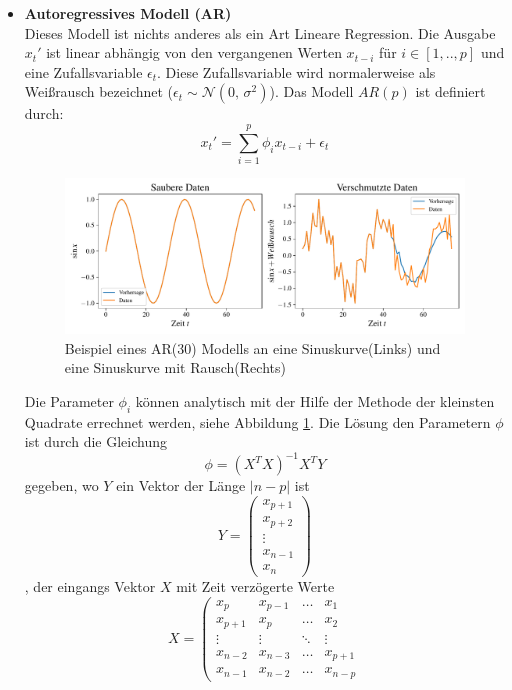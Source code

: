 \begin{itemize}
  \item \textbf{Autoregressives Modell (AR)}\\
  Dieses Modell ist nichts anderes als ein Art Lineare Regression. Die Ausgabe $x_t'$
  ist linear abhängig von den vergangenen Werten $x_{t-i}$ für $i\in[1,..,p]$ und
  eine Zufallsvariable $\epsilon_t$. Diese Zufallsvariable wird normalerweise
  als Weißrausch bezeichnet ($\epsilon_t \sim \mathcal{N}(0,\,\sigma^{2}) $).
  Das Modell $AR(p)$ ist definiert durch:
  \[
  x_t'=\sum_{i=1}^{p}\phi_ix_{t-i}+\epsilon_t
  \] 
  \begin{figure}[h]
      \centering
      \includegraphics[width=\textwidth,keepaspectratio]{../plots/ar_sauber_verschmutze_daten.pdf}
      \caption{Beispiel eines AR(30) Modells an eine Sinuskurve(Links) und eine
      Sinuskurve mit Rausch(Rechts)}
      \label{fig:ar}
  \end{figure}
  Die Parameter $\phi_i$ können analytisch mit der Hilfe der Methode der
  kleinsten Quadrate errechnet werden, siehe Abbildung \ref{fig:ar}. Die Lösung den Parametern $\phi$ ist
  durch die Gleichung
  \[
    \phi = (X^TX)^{-1}X^TY
  \]
  gegeben, wo $Y$ ein Vektor der Länge $|n-p|$ ist 
  \[
    Y = 
   \left(\begin{matrix}
    x_{p+1}\\
    x_{p+2}\\
    \vdots\\
    x_{n-1}\\
    x_{n}
    \end{matrix}\right)
  \]
  , der eingangs Vektor $X$ mit Zeit verzögerte Werte 
  \[
    X = 
    \left(\begin{matrix}
    x_{p}&x_{p-1}&\hdots&x_{1}\\
    x_{p+1}&x_{p}&\hdots&x_{2}\\
    \vdots&\vdots&\ddots&\vdots\\
    x_{n-2}&x_{n-3}&\hdots&x_{p+1}\\
    x_{n-1}&x_{n-2}&\hdots&x_{n-p}

\end{matrix}\]
\end{itemize}
